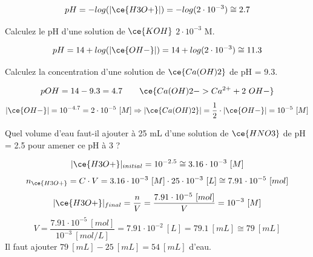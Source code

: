 \documentclass[
  11pt,
  a4paper,
  openany]{book}
\begin{document}
\begin{Answer}
\[
pH = - log(|\ce{H3O+}|) = - log(2 \cdot 10^{-3}) \cong 2.7
\]

\end{Answer}

\begin{Exercise}
Calculez le pH d'une solution de \(\ce{KOH}\) \(2 \cdot 10^{-3}\) M.

\end{Exercise}

\begin{Answer}
\[
pH = 14 + log(|\ce{OH-}|) = 14 + log(2 \cdot 10^{-3}) \cong 11.3
\]

\end{Answer}

\clearpage

\begin{Exercise}
Calculez la concentration d'une solution de \(\ce{Ca(OH)2}\) de pH = 9.3.

\end{Exercise}

\begin{Answer}
\[
\begin{split}
pOH = 14 - 9.3 = 4.7
\end{split}
\qquad
\begin{split}
\ce{Ca(OH)2 -> Ca^{2+} + 2\ OH-}
\end{split}
\]
\[
|\ce{OH-}| = 10^{-4.7} = 2 \cdot 10^{-5}\ [M] \Rightarrow |\ce{Ca(OH)2}| = \frac{1}{2} \cdot |\ce{OH-}| = 10^{-5}\ [M]
\]

\end{Answer}

\begin{Exercise}
Quel volume d'eau faut-il ajouter à 25 mL d'une solution de \(\ce{HNO3}\) de pH = 2.5 pour amener ce pH à 3 ?

\end{Exercise}

\begin{Answer}
\[
|\ce{H3O+}|_{initial} = 10^{-2.5} \cong 3.16 \cdot 10^{-3}\ [M]
\]
\[
n_{\ce{H3O+}} = C \cdot V = 3.16 \cdot 10^{-3}\ [M] \cdot 25 \cdot 10^{-3}\ [L] \cong 7.91 \cdot 10^{-5}\ [mol]
\]
\[
|\ce{H3O+}|_{final} = \frac{n}{V} = \frac{7.91 \cdot 10^{-5}\ [mol]}{V} = 10^{-3}\ [M]
\]
\[
V = \frac{7.91 \cdot 10^{-5}\ [mol]}{10^{-3}\ [mol/L]} = 7.91 \cdot 10^{-2}\ [L] = 79.1\ [mL] \cong 79\ [mL]
\]
Il faut ajouter \(79\ [mL] - 25\ [mL] = 54\ [mL]\) d'eau.

\end{Answer}
\end{document}
